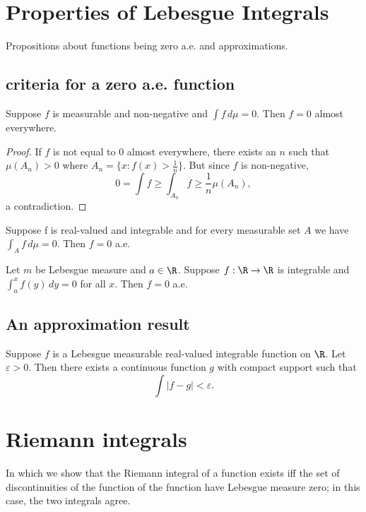 \begin{sloppypar}

\setcounter{chapter}{7}
\chapter{Properties of Lebesgue Integrals}
Propositions about functions being zero a.e. and approximations.

\section{criteria for a zero a.e. function}
\begin{prop}
  Suppose $f$ is measurable and non-negative and $\int f \,d\mu = 0$. Then $f = 0$ almost everywhere.
\end{prop}
\begin{proof}
  If $f$ is not equal to $0$ almost everywhere, there exists an $n$ such that $\mu(A_n) > 0$ where $A_n = \{x : f(x) > \frac{1}{n}\} $. But since $f$ is non-negative,
  \[
    0 = \int f \ge \int_{A_n}f \ge \frac{1}{n}\mu(A_n),\]
    a contradiction.
\end{proof}

\begin{prop} 
Suppose f is real-valued and integrable and for every measurable set $A$ we have $\int_A f \,d\mu = 0$. Then $f=0$ a.e.
\end{prop}

\begin{corollary}
  Let $m$ be Lebesgue measure and $a \in \R$. Suppose $ f:  \R \to \R $ is integrable and $\int_a^x f(y) \,dy = 0$ for all $x$. Then $f = 0$ a.e.
\end{corollary}

\section{An approximation result}

\begin{theorem}
  Suppose $f$ is a Lebesgue measurable real-valued integrable function on $\R$. Let $\varepsilon > 0$. Then there exists a continuous function $g$ with compact support such that
  \[
  \int|f-g| < \varepsilon
  .\] 
\end{theorem}

\chapter{Riemann integrals}
In which we show that the Riemann integral of a function exists iff the set of discontinuities of the function of the function have Lebesgue measure zero; in this case, the two integrals agree.


\end{sloppypar}

